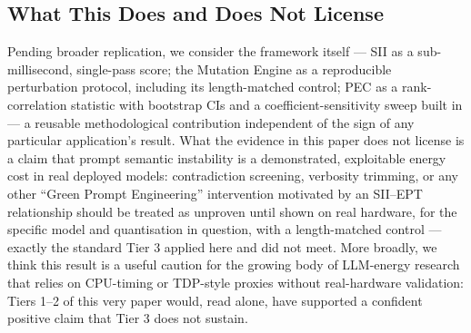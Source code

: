 \documentclass[conference]{IEEEtran}
\begin{document}
\subsection{What This Does and Does Not License}
Pending broader replication, we consider the framework itself ---
SII as a sub-millisecond, single-pass score; the Mutation Engine as a
reproducible perturbation protocol, including its length-matched
control; PEC as a rank-correlation statistic with bootstrap CIs and a
coefficient-sensitivity sweep built in --- a reusable methodological
contribution independent of the sign of any particular application's
result. What the evidence in this paper does not license is a claim
that prompt semantic instability is a demonstrated, exploitable energy
cost in real deployed models: contradiction screening, verbosity
trimming, or any other ``Green Prompt Engineering'' intervention
motivated by an SII--EPT relationship should be treated as unproven
until shown on real hardware, for the specific model and quantisation
in question, with a length-matched control --- exactly the standard
Tier 3 applied here and did not meet. More broadly, we think this
result is a useful caution for the growing body of LLM-energy research
that relies on CPU-timing or TDP-style proxies without real-hardware
validation: Tiers 1--2 of this very paper would, read alone, have
supported a confident positive claim that Tier 3 does not sustain.
\end{document}
